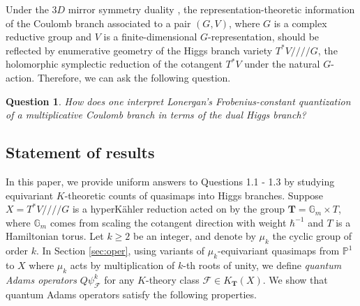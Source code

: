 \documentclass[reqno]{amsart}
\numberwithin{equation}{section}
\numberwithin{equation}{section}
\numberwithin{equation}{section}
\newtheorem{ques}[thm]{Question}
\theoremstyle{definition}
\theoremstyle{remark}
\theoremstyle{remark}
\begin{document}
Under the $3D$ mirror symmetry duality \cite{3d-mirror, kamnitzer-survey}, the representation-theoretic information of the Coulomb branch associated to a pair $(G, V)$, where $G$ is a complex reductive group and $V$ is a finite-dimensional $G$-representation, should be reflected by enumerative geometry of the Higgs branch variety $T^*V  /\!\!/\!\!/\!\!/ G$, the holomorphic symplectic reduction of the cotangent $T^*V$ under the natural $G$-action. Therefore, we can ask the following question.
\begin{ques}
    How does one interpret Lonergan's Frobenius-constant quantization of a multiplicative Coulomb branch in terms of the dual Higgs branch?
\end{ques}

\subsection{Statement of results}
In this paper, we provide uniform answers to Questions 1.1 - 1.3 by studying equivariant $K$-theoretic counts of quasimaps into Higgs branches. Suppose $X = T^*V  /\!\!/\!\!/\!\!/ G$ is a hyperK\"ahler reduction acted on by the group $\mathbf{T} = \mathbb{G}_m \times T$, where $\mathbb{G}_m$ comes from scaling the cotangent direction with weight $\hbar^{-1}$ and $T$ is a Hamiltonian torus. Let $k \geq 2$ be an integer, and denote by $\mu_k$ the cyclic group of order $k$. In Section \ref{sec:oper}, using variants of $\mu_k$-equivariant quasimaps from $\mathbb{P}^1$ to $X$ where $\mu_k$ acts by multiplication of $k$-th roots of unity, we define \emph{quantum Adams operators} $Q\psi_{\mathcal{F}}^k$ for any $K$-theory class $\mathcal{F} \in K_{\mathbf{T}}(X)$. We show that quantum Adams operators satisfy the following properties.
\end{document}
